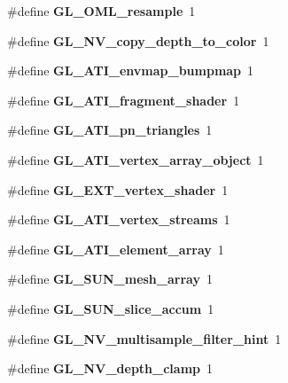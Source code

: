 \begin{DoxyCompactItemize}
\item 
\#define {\bfseries G\+L\+\_\+\+O\+M\+L\+\_\+resample}~1\label{_s_d_l__opengl_8h_afbda2e4dfc0b396360a575b74dd40c52}

\item 
\#define {\bfseries G\+L\+\_\+\+N\+V\+\_\+copy\+\_\+depth\+\_\+to\+\_\+color}~1\label{_s_d_l__opengl_8h_a81844d43109d5dedcc2e186dea36aa8b}

\item 
\#define {\bfseries G\+L\+\_\+\+A\+T\+I\+\_\+envmap\+\_\+bumpmap}~1\label{_s_d_l__opengl_8h_a0c2accdaf940176f35e5caeffeff6434}

\item 
\#define {\bfseries G\+L\+\_\+\+A\+T\+I\+\_\+fragment\+\_\+shader}~1\label{_s_d_l__opengl_8h_ab624beea8f5b93099db7f43c31ca031b}

\item 
\#define {\bfseries G\+L\+\_\+\+A\+T\+I\+\_\+pn\+\_\+triangles}~1\label{_s_d_l__opengl_8h_af2f384840cbf89a3fba9c8eb4883928c}

\item 
\#define {\bfseries G\+L\+\_\+\+A\+T\+I\+\_\+vertex\+\_\+array\+\_\+object}~1\label{_s_d_l__opengl_8h_a24e8dfd8e3bdec6a16257ce84e80396c}

\item 
\#define {\bfseries G\+L\+\_\+\+E\+X\+T\+\_\+vertex\+\_\+shader}~1\label{_s_d_l__opengl_8h_a0d9ddf60184cd6c4c4bb5073d7e06468}

\item 
\#define {\bfseries G\+L\+\_\+\+A\+T\+I\+\_\+vertex\+\_\+streams}~1\label{_s_d_l__opengl_8h_aa44234dbeb434adfee21c0b6a4d3b481}

\item 
\#define {\bfseries G\+L\+\_\+\+A\+T\+I\+\_\+element\+\_\+array}~1\label{_s_d_l__opengl_8h_af33b561e10a18461db5b3fb8db8c9567}

\item 
\#define {\bfseries G\+L\+\_\+\+S\+U\+N\+\_\+mesh\+\_\+array}~1\label{_s_d_l__opengl_8h_a94e19df9f43ec8befe7d3d990e4f4e1b}

\item 
\#define {\bfseries G\+L\+\_\+\+S\+U\+N\+\_\+slice\+\_\+accum}~1\label{_s_d_l__opengl_8h_a59588c571d0add960e2b3a7992a43164}

\item 
\#define {\bfseries G\+L\+\_\+\+N\+V\+\_\+multisample\+\_\+filter\+\_\+hint}~1\label{_s_d_l__opengl_8h_af7d93fe994271cab278f5ae18aa9cfd6}

\item 
\#define {\bfseries G\+L\+\_\+\+N\+V\+\_\+depth\+\_\+clamp}~1\label{_s_d_l__opengl_8h_a223ddd63e5c2f5320ff8319bd1ce65f3}


\end{DoxyCompactItemize}

